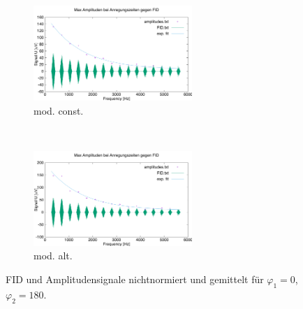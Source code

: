 \documentclass{article}
\begin{document}
        \begin{figure}[h]
            \centering
            \begin{subfigure}[b]{0.4\textwidth}
                \centering
                \includegraphics[width=6cm]{../Bilddateien/CPMG-0-180-constant-avg.png}
                \caption{mod. const.}
                \label{fig:CPMG-0-180-constant-avg}
            \end{subfigure}
            \
            \begin{subfigure}[b]{0.4\textwidth}
                \centering
                \includegraphics[width=6cm]{../Bilddateien/CPMG-0-180-alternating-avg.png}
                \caption{mod. alt.}
                \label{fig:CPMG-0-180-alternating-avg}
            \end{subfigure}
            \caption{FID und Amplitudensignale nichtnormiert und gemittelt für $\varphi_1 = 0$, $\varphi_2 = 180$.}
            \label{fig:CPMG-0-180-avg}
        \end{figure}
\end{document}
